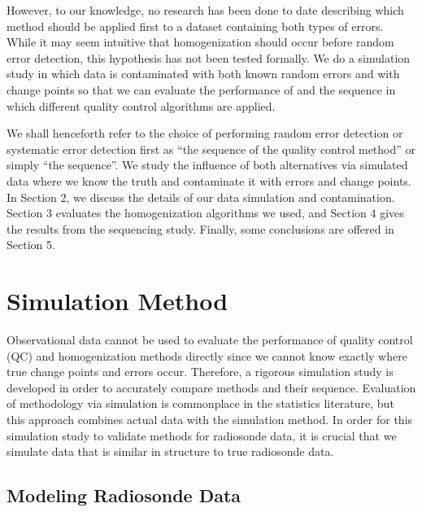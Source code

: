 \documentclass[12pt]{article}
\begin{document}
\begin{doublespacing}
However, to our knowledge, no research has been done to date describing which method should be applied first to a dataset containing both types of errors.  While it may seem intuitive that homogenization should occur before random error detection, this hypothesis has not been tested formally.  We do a simulation study in which data is contaminated with both known random errors and with change points so that we can  evaluate the performance of and the sequence in which  different quality control algorithms are applied.

We shall henceforth refer to the choice of performing random error detection or systematic error detection first  as ``the sequence of the quality control method'' or simply ``the sequence''.  We study the influence of both alternatives via simulated data where we know the truth and contaminate it with errors and change points.  In Section 2, we discuss the details of our data simulation and contamination.  Section 3 evaluates the homogenization algorithms we used, and Section 4 gives the results from the sequencing study.  Finally, some conclusions are offered in Section 5.

\section{Simulation Method}
Observational data cannot be used to evaluate the performance of quality control (QC) and homogenization methods directly since we cannot know exactly where true change points and errors occur.  Therefore, a rigorous simulation study is developed in order to accurately compare methods and their sequence.  Evaluation of methodology via simulation is commonplace in the statistics literature, but this approach combines actual data with the simulation method.  In order for this simulation study to validate methods for radiosonde data, it is crucial that we simulate data that is similar in structure to true radiosonde data.

\subsection{Modeling Radiosonde Data}
\label{ssec:model}


\end{doublespacing}
\end{document}
